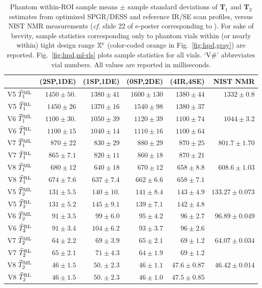 \begin{table*} [t]
	\centering
	\begin{tabu} {c || r r r | r || r}
		\hline \hline
		 			& (2SP,1DE)			& (1SP,1DE) 		& (0SP,2DE)			& (4IR,4SE)			& NIST NMR\\
		\hline
		V5 $\widehat{T}_1^\mathrm{ML}$ 	& $1450 \pm 50.$	& $1380 \pm 41$ 	& $1600 \pm 130$	& $1380 \pm 44$		& $1332 \pm 0.8$ \\
		V5 $\widehat{T}_1^\mathrm{RL}$	& $1450 \pm 26$ 	& $1370 \pm 16$		& $1540 \pm 98$ 	& $1380 \pm 37$		& \\
		\hline
		V6 $\widehat{T}_1^\mathrm{ML}$ 	& $1100 \pm 30.$	& $1050 \pm 39$		& $1120 \pm 39$ 	& $1100 \pm 74$ 	& $1044 \pm 3.2$ \\
		V6 $\widehat{T}_1^\mathrm{RL}$ 	& $1100 \pm 15$ 	& $1040 \pm 14$ 	& $1110 \pm 16$ 	& $1100 \pm 64$ 	& \\
		\hline
		V7 $\widehat{T}_1^\mathrm{ML}$ 	& $870 \pm 22$ 		& $830 \pm 29$ 		& $880 \pm 29$		& $870 \pm 25$		& $801.7 \pm 1.70$ \\
		V7 $\widehat{T}_1^\mathrm{RL}$ 	& $865 \pm 7.1$ 	& $820 \pm 11$		& $860 \pm 18$		& $870 \pm 21$		& \\
		\hline
		V8 $\widehat{T}_1^\mathrm{ML}$ 	& $680 \pm 12$ 		& $640 \pm 18$		& $670 \pm 12$ 		& $658 \pm 8.8$ 	& $608.6 \pm 1.03$ \\
		V8 $\widehat{T}_1^\mathrm{RL}$ 	& $674 \pm 7.6$		& $637 \pm 7.4$ 	& $662 \pm 6.6$		& $658 \pm 7.1$		& \\
		\hline \hline
		V5 $\widehat{T}_2^\mathrm{ML}$ 	& $131 \pm 5.5$		& $140 \pm 10.$		& $141 \pm 8.4$		& $143 \pm 4.9$		& $133.27 \pm 0.073$ \\
		V5 $\widehat{T}_2^\mathrm{RL}$ 	& $131 \pm 5.2$ 	& $145 \pm 9.1$		& $139 \pm 7.1$		& $142 \pm 4.8$ 	& \\
		\hline
		V6 $\widehat{T}_2^\mathrm{ML}$	& $91 \pm 3.5$ 		& $99 \pm 6.0$ 		& $95 \pm 4.2$ 		& $96 \pm 2.7$ 		& $96.89 \pm 0.049$ \\
		V6 $\widehat{T}_2^\mathrm{RL}$ 	& $91 \pm 3.4$ 		& $104 \pm 6.2$		& $93 \pm 3.7$ 		& $96 \pm 2.6$		& \\
		\hline
		V7 $\widehat{T}_2^\mathrm{ML}$ 	& $64 \pm 2.2$		& $69 \pm 3.9$		& $65 \pm 2.1$ 		& $69 \pm 1.2$ 		& $64.07 \pm 0.034$ \\
		V7 $\widehat{T}_2^\mathrm{RL}$ 	& $65 \pm 2.1$ 		& $71 \pm 4.3$		& $64 \pm 1.9$ 		& $69 \pm 1.2$ 		& \\
		\hline
		V8 $\widehat{T}_2^\mathrm{ML}$	& $46 \pm 1.5$ 		& $50. \pm 2.3$ 	& $46 \pm 1.1$		& $47.6 \pm 0.87$ 	& $46.42 \pm 0.014$ \\
		V8 $\widehat{T}_2^\mathrm{RL}$	& $46 \pm 1.5$ 		& $50. \pm 2.3$ 	& $46 \pm 1.0$ 		& $47.5 \pm 0.85$ 	& \\	
		\hline \hline	 
	\end{tabu}
	\caption{
		Phantom within-ROI sample means $\pm$ sample standard deviations 
		of $\mathbf{T}_1$ and $\mathbf{T}_2$ estimates 
		from optimized SPGR/DESS and reference IR/SE scan profiles, 
		versus NIST NMR measurements (\emph{cf.} slide 22 
		of e-poster corresponding to \cite{keenan:16:msm}).
		For sake of brevity, 
		sample statistics corresponding only to phantom vials 
		within (or nearly within) tight design range $\mathbb{X}^\mathrm{t}$ 
		(color-coded orange in Fig.~\ref{fig:hpd,gray}) are reported. 
		Fig.~\ref{fig:hpd,ml-rls} plots sample statistics for all vials.
		`V\#' abbreviates vial numbers. 
		All values are reported in milliseconds.
	}
	\label{table:hpd,accuracy}
\end{table*}

